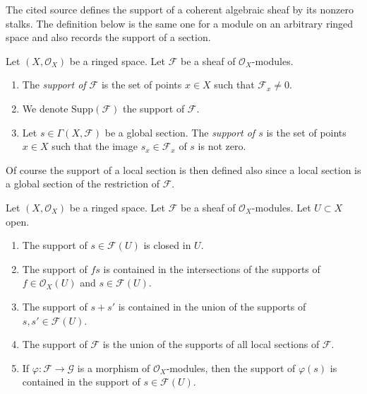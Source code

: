 \begin{definition}
\label{definition-support}
\begin{reference}
\cite[Chapter III, \S 6, no. 81, opening paragraph, p. 276]{FAC}
\end{reference}
\begin{history}
The cited source defines the support of a coherent algebraic sheaf by its
nonzero stalks. The definition below is the same one for a module on an
arbitrary ringed space and also records the support of a section.
\end{history}
Let $(X, \mathcal{O}_X)$ be a ringed space.
Let $\mathcal{F}$ be a sheaf of $\mathcal{O}_X$-modules.
\begin{enumerate}
\item The {\it support of $\mathcal{F}$} is the set of
points $x \in X$ such that $\mathcal{F}_x \not = 0$.
\item We denote $\text{Supp}(\mathcal{F})$ the support of $\mathcal{F}$.
\item Let $s \in \Gamma(X, \mathcal{F})$ be a global section.
The {\it support of $s$} is the set of points $x \in X$
such that the image $s_x \in \mathcal{F}_x$ of $s$ is
not zero.
\end{enumerate}
\end{definition}

\noindent
Of course the support of a local section is then defined also
since a local section is a global section of the restriction of
$\mathcal{F}$.

\begin{lemma}
\label{lemma-support-section-closed}
Let $(X, \mathcal{O}_X)$ be a ringed space.
Let $\mathcal{F}$ be a sheaf of $\mathcal{O}_X$-modules.
Let $U \subset X$ open.
\begin{enumerate}
\item The support of $s \in \mathcal{F}(U)$ is closed in $U$.
\item The support of $fs$ is contained in the intersections
of the supports of $f \in \mathcal{O}_X(U)$ and $s \in \mathcal{F}(U)$.
\item The support of $s + s'$ is contained in the union of
the supports of $s, s' \in \mathcal{F}(U)$.
\item The support of $\mathcal{F}$ is the union of the supports
of all local sections of $\mathcal{F}$.
\item If $\varphi : \mathcal{F} \to \mathcal{G}$ is a morphism of
$\mathcal{O}_X$-modules, then the support of $\varphi(s)$ is
contained in the support of $s \in \mathcal{F}(U)$.
\end{enumerate}
\end{lemma}

